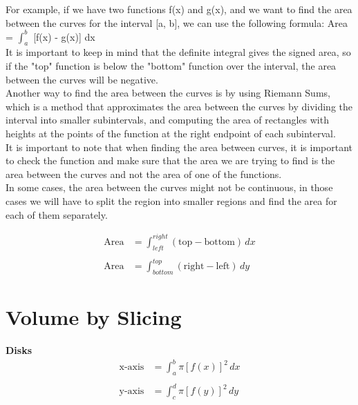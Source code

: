 For example, if we have two functions f(x) and g(x), and we want to find the 
area between the curves for the interval [a, b], we can use the following 
formula: Area = $\int_{a}^{b}$ [f(x) - g(x)] dx\\

It is important to keep in mind that the definite integral gives the signed 
area, so if the "top" function is below the "bottom" function over the interval, 
the area between the curves will be negative.\\

Another way to find the area between the curves is by using Riemann Sums, which 
is a method that approximates the area between the curves by dividing the 
interval into smaller subintervals, and computing the area of rectangles with 
heights at the points of the function at the right endpoint of each 
subinterval.\\

It is important to note that when finding the area between curves, it is 
important to check the function and make sure that the area we are trying to 
find is the area between the curves and not the area of one of the functions.\\

In some cases, the area between the curves might not be continuous, in those 
cases we will have to split the region into smaller regions and find the area 
for each of them separately.\\

\begin{framed}
  \begin{align*}
    \text{Area} &= \int_{left}^{right} (\text{top} - \text{bottom}) \, dx\\\\
    \text{Area} &= \int_{bottom}^{top} (\text{right} - \text{left}) \, dy
  \end{align*}
\end{framed}


\section{Volume by Slicing}

\begin{framed}
  \noindent \textbf{Disks}
  \begin{align*}
    \text{x-axis} &= \int_a^b \pi [f(x)]^2 \, dx\\\\
    \text{y-axis} &= \int_c^d \pi [f(y)]^2 \, dy
  \end{align*}
\end{framed}

